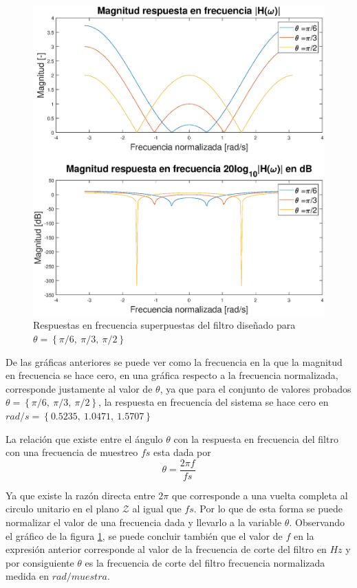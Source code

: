 \begin{enumerate}
    \begin{figure}[H]
        \centering
        \includegraphics[scale = 0.4]{Figuras/p1_1-Respuesta_superpuesta.eps}
        \caption{Respuestas en frecuencia superpuestas del filtro diseñado para $ \theta = \left \lbrace \pi/6,~ \pi/3,~\pi/2 \right \rbrace$}
        \label{frec_superpuesta}
    \end{figure}
    


De las gráficas anteriores se puede ver como la frecuencia en la que la magnitud en frecuencia se hace cero, en una gráfica respecto a la frecuencia normalizada, corresponde justamente al valor de $\theta$, ya que para el conjunto de valores probados  $ \theta = \left \lbrace \pi/6,~ \pi/3,~\pi/2 \right \rbrace$, la respuesta en frecuencia del sistema se hace cero en $ rad/s = \left \lbrace 0.5235,~ 1.0471,~1.5707 \right \rbrace$

 
La relación que existe entre el ángulo $\theta$ con la respuesta en frecuencia del filtro con una frecuencia de muestreo $fs$ esta dada por 
$$ \theta = \frac{2 \pi f}{fs}$$ 

Ya que existe la razón directa entre $2\pi$ que corresponde a una vuelta completa al circulo unitario en el plano $\mathcal{Z}$ al igual que $fs$. Por lo que de esta forma se puede normalizar el valor de  una  frecuencia dada y llevarlo a la variable $\theta$. Observando el gráfico de la figura \ref{frec_superpuesta}, se puede concluir también que el valor de $f$ en la expresión anterior corresponde al valor de la frecuencia de corte del filtro en $Hz$ y por consiguiente $\theta$ es la frecuencia de corte del filtro frecuencia normalizada medida en $rad/muestra$.


\end{enumerate}
